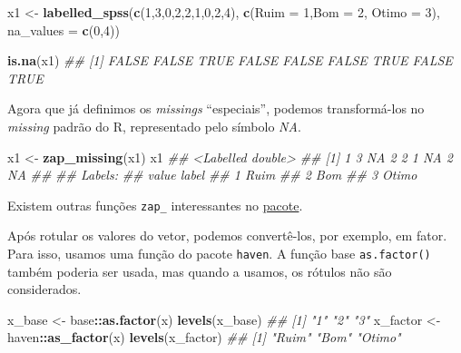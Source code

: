 \documentclass[
]{book}
\newenvironment{Shaded}{\begin{snugshade}}{\end{snugshade}}
\newcommand{\CommentTok}[1]{\textcolor[rgb]{0.56,0.35,0.01}{\textit{#1}}}
\newcommand{\DataTypeTok}[1]{\textcolor[rgb]{0.13,0.29,0.53}{#1}}
\newcommand{\DecValTok}[1]{\textcolor[rgb]{0.00,0.00,0.81}{#1}}
\newcommand{\KeywordTok}[1]{\textcolor[rgb]{0.13,0.29,0.53}{\textbf{#1}}}
\newcommand{\NormalTok}[1]{#1}
\newcommand{\OperatorTok}[1]{\textcolor[rgb]{0.81,0.36,0.00}{\textbf{#1}}}
\newcommand{\StringTok}[1]{\textcolor[rgb]{0.31,0.60,0.02}{#1}}
\begin{document}
\begin{Shaded}
\begin{Highlighting}[]
\NormalTok{x1 <-}\StringTok{ }\KeywordTok{labelled_spss}\NormalTok{(}\KeywordTok{c}\NormalTok{(}\DecValTok{1}\NormalTok{,}\DecValTok{3}\NormalTok{,}\DecValTok{0}\NormalTok{,}\DecValTok{2}\NormalTok{,}\DecValTok{2}\NormalTok{,}\DecValTok{1}\NormalTok{,}\DecValTok{0}\NormalTok{,}\DecValTok{2}\NormalTok{,}\DecValTok{4}\NormalTok{), }\KeywordTok{c}\NormalTok{(}\DataTypeTok{Ruim =} \DecValTok{1}\NormalTok{,}\DataTypeTok{Bom =} \DecValTok{2}\NormalTok{, }\DataTypeTok{Otimo =} \DecValTok{3}\NormalTok{), }\DataTypeTok{na_values =} \KeywordTok{c}\NormalTok{(}\DecValTok{0}\NormalTok{,}\DecValTok{4}\NormalTok{))}
    
\KeywordTok{is.na}\NormalTok{(x1)}
\CommentTok{## [1] FALSE FALSE  TRUE FALSE FALSE FALSE  TRUE FALSE  TRUE}
\end{Highlighting}
\end{Shaded}

Agora que já definimos os \emph{missings} ``especiais'', podemos transformá-los no \emph{missing} padrão do R, representado pelo símbolo \emph{NA}.

\begin{Shaded}
\begin{Highlighting}[]
\NormalTok{x1 <-}\StringTok{ }\KeywordTok{zap_missing}\NormalTok{(x1)}
\NormalTok{x1}
\CommentTok{## <Labelled double>}
\CommentTok{## [1]  1  3 NA  2  2  1 NA  2 NA}
\CommentTok{## }
\CommentTok{## Labels:}
\CommentTok{##  value label}
\CommentTok{##      1  Ruim}
\CommentTok{##      2   Bom}
\CommentTok{##      3 Otimo}
\end{Highlighting}
\end{Shaded}

Existem outras funções \texttt{zap\_} interessantes no \href{https://cran.r-project.org/web/packages/haven/haven.pdf}{pacote}.

Após rotular os valores do vetor, podemos convertê-los, por exemplo, em fator. Para isso, usamos uma função do pacote \texttt{haven}.
A função base \texttt{as.factor()} também poderia ser usada, mas quando a usamos, os rótulos não são considerados.

\begin{Shaded}
\begin{Highlighting}[]
\NormalTok{x_base <-}\StringTok{ }\NormalTok{base}\OperatorTok{::}\KeywordTok{as.factor}\NormalTok{(x)}
\KeywordTok{levels}\NormalTok{(x_base)}
\CommentTok{## [1] "1" "2" "3"}
\NormalTok{x_factor <-}\StringTok{ }\NormalTok{haven}\OperatorTok{::}\KeywordTok{as_factor}\NormalTok{(x)}
\KeywordTok{levels}\NormalTok{(x_factor)}
\CommentTok{## [1] "Ruim"  "Bom"   "Otimo"}
\end{Highlighting}
\end{Shaded}
\end{document}
